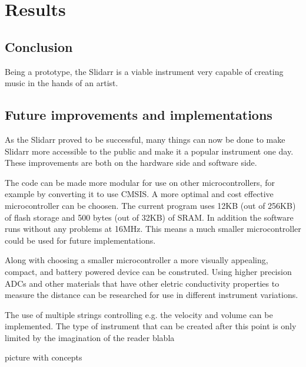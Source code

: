 \documentclass{article}
\begin{document}
\section{Results}

\subsection{Conclusion}
Being a prototype, the Slidarr is a viable instrument very capable of creating music in the hands of an artist.

\subsection{Future improvements and implementations}
As the Slidarr proved to be successful, many things can now be done to make Slidarr more accessible to the public and make it a popular instrument one day. These improvements are both on the hardware side and software side.

The code can be made more modular for use on other microcontrollers, for example by converting it to use CMSIS. A more optimal and cost effective microcontroller can be choosen. The current program uses 12KB (out of 256KB) of flash storage and 500 bytes (out of 32KB) of SRAM. In addition the software runs without any problems at 16MHz. This means a much smaller microcontroller could be used for future implementations.

Along with choosing a smaller microcontroller a more visually appealing, compact, and battery powered device can be construted. Using higher precision ADCs and other materials that have other eletric conductivity properties to measure the distance can be researched for use in different instrument variations.

The use of multiple strings controlling e.g. the velocity and volume can be implemented. The type of instrument that can be created after this point is only limited by the imagination of the reader blabla

picture with concepts
\end{document}
